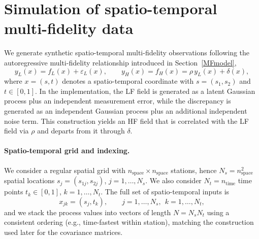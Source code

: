 \documentclass[12pt]{article}
\begin{document}
\section{Simulation of spatio-temporal multi-fidelity data}\label{sec:sim_data}
We generate synthetic spatio-temporal multi-fidelity observations following the autoregressive
multi-fidelity relationship introduced in Section~\ref{MFmodel},
\begin{equation}\label{eq:sim_mf_relation}
    y_L(x) = f_L(x) + \varepsilon_L(x), 
    \qquad
    y_H(x) = f_H(x) = \rho\, y_L(x) + \delta(x),
\end{equation}
where $x=(s,t)$ denotes a spatio-temporal coordinate with $s=(s_1,s_2)$ and $t\in[0,1]$.
In the implementation, the LF field is generated as a latent Gaussian process plus an independent
measurement error, while the discrepancy is generated as an independent Gaussian process plus an
additional independent noise term. This construction yields an HF field that is correlated with the LF
field via $\rho$ and departs from it through $\delta$.

\paragraph{Spatio-temporal grid and indexing.}
We consider a regular spatial grid with $n_{\text{space}}\times n_{\text{space}}$ stations, hence
$N_s=n_{\text{space}}^2$ spatial locations $s_j=(s_{1j},s_{2j})$, $j=1,\dots,N_s$.
We also consider $N_t=n_{\text{time}}$ time points $t_k\in[0,1]$, $k=1,\dots,N_t$.
The full set of spatio-temporal inputs is
\[
x_{jk}=(s_j,t_k), \qquad j=1,\dots,N_s,\ \ k=1,\dots,N_t,
\]
and we stack the process values into vectors of length $N=N_sN_t$ using a consistent ordering
(e.g., time-fastest within station), matching the construction used later for the covariance matrices.
\end{document}
